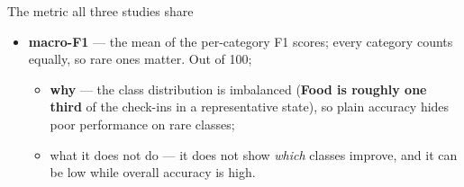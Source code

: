 \documentclass{beamer}
\begin{document}
\begin{frame}{The metric all three studies share}
    \begin{itemize}\setlength{\itemsep}{1.4ex}
        \item \textbf{macro-F1} --- the mean of the per-category F1 scores; every category counts
              equally, so rare ones matter. Out of 100;
              \begin{itemize}\setlength{\itemsep}{2pt}
                  \item \textbf{why} --- the class distribution is imbalanced (\textbf{Food is
                        roughly one third} of the check-ins in a representative state), so plain
                        accuracy hides poor performance on rare classes;
                  \item \alert{what it does not do} --- it does not show \emph{which} classes
                        improve, and it can be low while overall accuracy is high.
              \end{itemize}
    \end{itemize}


\end{frame}
\end{document}
